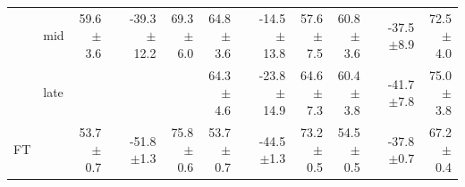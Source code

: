 \begin{tabular}{llrrrrrrrrrrrr}
 & mid & 59.6\tiny{$\pm$3.6} &  & -39.3\tiny{$\pm$12.2} & 69.3\tiny{$\pm$6.0} & 64.8\tiny{$\pm$3.6} &  & -14.5\tiny{$\pm$13.8} & 57.6\tiny{$\pm$7.5} & 60.8\tiny{$\pm$3.6} &  & -37.5\tiny{$\pm$8.9} & 72.5\tiny{$\pm$4.0} \\
 & late &  &  &  &  & 64.3\tiny{$\pm$4.6} &  & -23.8\tiny{$\pm$14.9} & 64.6\tiny{$\pm$7.3} & 60.4\tiny{$\pm$3.8} &  & -41.7\tiny{$\pm$7.8} & 75.0\tiny{$\pm$3.8} \\
\midrule
FT & & 53.7\tiny{$\pm$0.7} &  & -51.8\tiny{$\pm$1.3} & 75.8\tiny{$\pm$0.6} & 53.7\tiny{$\pm$0.7} &  & -44.5\tiny{$\pm$1.3} & 73.2\tiny{$\pm$0.5} & 54.5\tiny{$\pm$0.5} &  & -37.8\tiny{$\pm$0.7} & 67.2\tiny{$\pm$0.4} \\
\bottomrule
\end{tabular}
